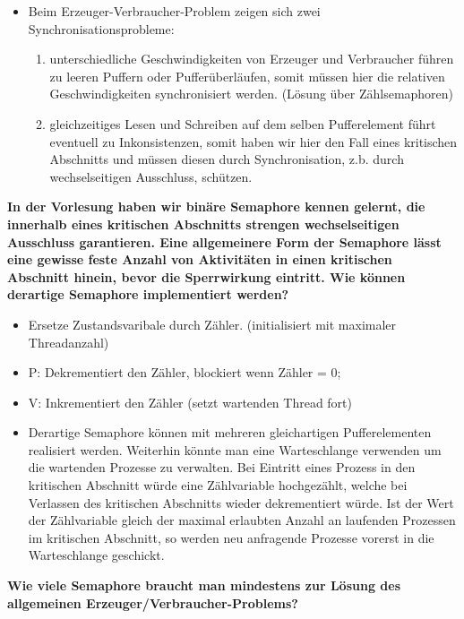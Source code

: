 \documentclass[a4paper]{article}
\begin{document}
\begin{description*}
\begin{itemize}
        \item Beim Erzeuger-Verbraucher-Problem zeigen sich zwei Synchronisationsprobleme:
              \begin{enumerate}
                  \item unterschiedliche Geschwindigkeiten von Erzeuger und Verbraucher führen zu leeren Puffern oder Pufferüberläufen, somit müssen hier die relativen Geschwindigkeiten synchronisiert werden. (Lösung über Zählsemaphoren)
                  \item gleichzeitiges Lesen und Schreiben auf dem selben Pufferelement führt eventuell zu Inkonsistenzen, somit haben wir hier den Fall eines kritischen Abschnitts und müssen diesen durch Synchronisation, z.b. durch wechselseitigen Ausschluss, schützen.
              \end{enumerate}
    \end{itemize}
    \item \textbf{In der Vorlesung haben wir binäre Semaphore kennen gelernt, die innerhalb eines kritischen Abschnitts strengen wechselseitigen Ausschluss garantieren. Eine allgemeinere Form der Semaphore lässt eine gewisse feste Anzahl von Aktivitäten in einen kritischen Abschnitt hinein, bevor die Sperrwirkung eintritt. Wie können derartige Semaphore implementiert werden?}
    \begin{itemize}
        \item Ersetze Zustandsvaribale durch Zähler. (initialisiert mit maximaler Threadanzahl)
        \item P: Dekrementiert den Zähler, blockiert wenn Zähler = 0;
        \item V: Inkrementiert den Zähler (setzt wartenden Thread fort)
        \item Derartige Semaphore können mit mehreren gleichartigen Pufferelementen realisiert werden. Weiterhin könnte man eine Warteschlange verwenden um die wartenden Prozesse zu verwalten. Bei Eintritt eines Prozess in den kritischen Abschnitt würde eine Zählvariable hochgezählt, welche bei Verlassen des kritischen Abschnitts wieder dekrementiert würde. Ist der Wert der Zählvariable gleich der maximal erlaubten Anzahl an laufenden Prozessen im kritischen Abschnitt, so werden neu anfragende Prozesse vorerst in die Warteschlange geschickt.
    \end{itemize}
    \item \textbf{Wie viele Semaphore braucht man mindestens zur Lösung des allgemeinen Erzeuger/Verbraucher-Problems?}
    \begin{itemize}

\end{itemize}
\end{description*}
\end{document}
